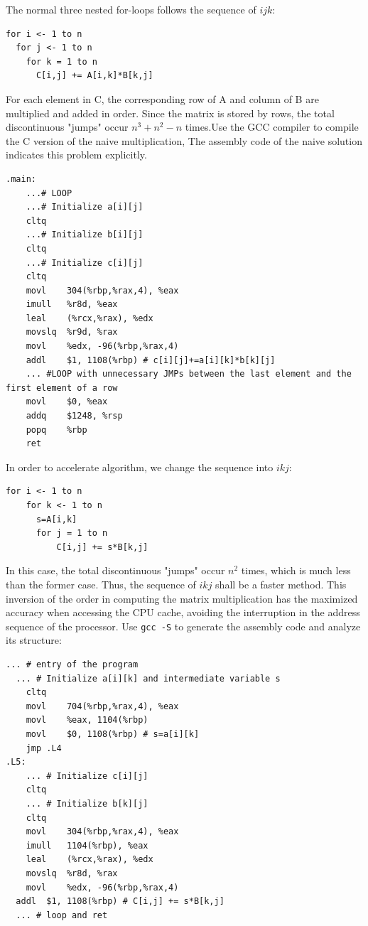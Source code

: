 \documentclass[UTF8]{ctexart}
\begin{document}
The normal three nested for-loops follows the sequence of \(ijk\):

\begin{lstlisting}[style=pseudocode]
for i <- 1 to n
  for j <- 1 to n
    for k = 1 to n
      C[i,j] += A[i,k]*B[k,j]
\end{lstlisting}
For each element in C, the corresponding row of A and column of B are
multiplied and added in order. Since the matrix is stored by rows, the
total discontinuous "jumps" occur \(n^3+n^2-n\) times.Use the GCC compiler
to compile the C version of the naive multiplication, The assembly code of the naive solution
indicates this problem explicitly.

\begin{lstlisting}[style=pseudocode]
  .main:
    ...# LOOP
    ...# Initialize a[i][j]
    cltq
    ...# Initialize b[i][j]
    cltq
    ...# Initialize c[i][j]
    cltq
    movl	304(%rbp,%rax,4), %eax
    imull	%r8d, %eax
    leal	(%rcx,%rax), %edx
    movslq	%r9d, %rax
    movl	%edx, -96(%rbp,%rax,4)
    addl	$1, 1108(%rbp) # c[i][j]+=a[i][k]*b[k][j]
    ... #LOOP with unnecessary JMPs between the last element and the first element of a row
    movl	$0, %eax
    addq	$1248, %rsp
    popq	%rbp
    ret
  \end{lstlisting}

In order to accelerate algorithm, we change the sequence into \(ikj\):

\begin{lstlisting}[style=pseudocode]
  for i <- 1 to n
    for k <- 1 to n
      s=A[i,k]
      for j = 1 to n
          C[i,j] += s*B[k,j]
\end{lstlisting}

In this case, the total discontinuous "jumps" occur \(n^2\) times,
which is much less than the former case. Thus, the sequence of \(ikj\)
shall be a faster method. This inversion of the order in computing the
matrix multiplication has the maximized accuracy when accessing the
CPU cache, avoiding the interruption in the address sequence of the
processor. Use \lstinline{gcc -S} to generate the assembly code and analyze its structure:

\begin{lstlisting}[style=pseudocode]
  ... # entry of the program
  ... # Initialize a[i][k] and intermediate variable s
	cltq
	movl	704(%rbp,%rax,4), %eax
	movl	%eax, 1104(%rbp)
	movl	$0, 1108(%rbp) # s=a[i][k]
	jmp	.L4
.L5:
	... # Initialize c[i][j]
	cltq
	... # Initialize b[k][j]
	cltq
	movl	304(%rbp,%rax,4), %eax
	imull	1104(%rbp), %eax
	leal	(%rcx,%rax), %edx
	movslq	%r8d, %rax
	movl	%edx, -96(%rbp,%rax,4)
  addl	$1, 1108(%rbp) # C[i,j] += s*B[k,j]
  ... # loop and ret
\end{lstlisting}
\end{document}
